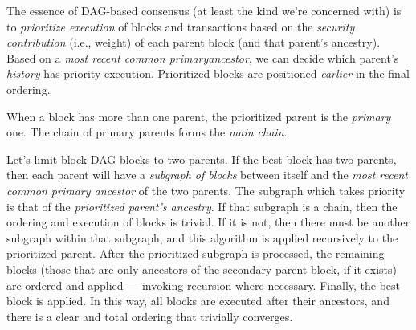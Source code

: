 The essence of DAG-based consensus (at least the kind we're concerned with) is to \emph{prioritize execution} of blocks and transactions based on the \emph{security contribution} (i.e., weight) of each parent block (and that parent's ancestry).
Based on a \emph{most recent common primary\footnotemark ancestor}, we can decide which parent's \emph{history} has priority execution.
Prioritized blocks are positioned \emph{earlier} in the final ordering.


When a block has more than one parent, the prioritized parent is the \emph{primary} one.
The chain of primary parents forms the \emph{main chain}.


Let's limit block-DAG blocks to two parents.
If the best block has two parents, then each parent will have a \emph{subgraph of blocks} between itself and the \emph{most recent common primary ancestor} of the two parents.
The subgraph which takes priority is that of the \emph{prioritized parent's ancestry}.
If that subgraph is a chain, then the ordering and execution of blocks is trivial.
If it is not, then there must be another subgraph within that subgraph, and this algorithm is applied recursively to the prioritized parent.
After the prioritized subgraph is processed, the remaining blocks (those that are only ancestors of the secondary parent block, if it exists) are ordered and applied --- invoking recursion where necessary.
Finally, the best block is applied.
In this way, all blocks are executed after their ancestors, and there is a clear and total ordering that trivially converges.

